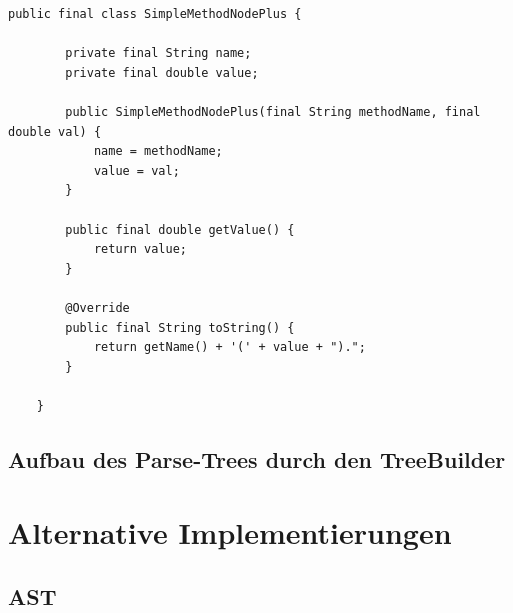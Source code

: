\begin{lstlisting}[caption={Code für eine Builder-Klasse mit inneren Scope-Klassen},label=lst:treebuilder1]
	public final class SimpleMethodNodePlus {
	
		private final String name;
		private final double value;
		
		public SimpleMethodNodePlus(final String methodName, final double val) {
			name = methodName;
			value = val;
		}
	
		public final double getValue() {
			return value;
		}
		
		@Override
		public final String toString() {
			return getName() + '(' + value + ").";
		}
	
	}
\end{lstlisting}

\subsection{Aufbau des Parse-Trees durch den TreeBuilder}

\section{Alternative Implementierungen}

\subsection{AST}\label{sct:4.3.4:ast}

